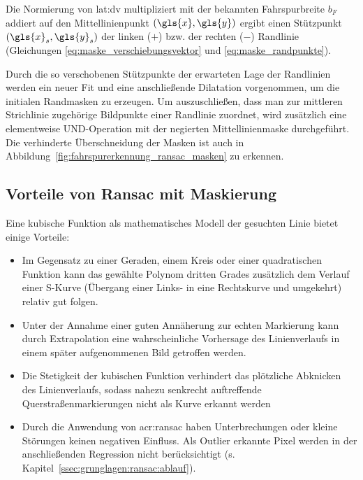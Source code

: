 Die Normierung von \gls{lat:dv} multipliziert mit der bekannten Fahrspurbreite \( b_F \) addiert auf den Mittellinienpunkt \( (\gls{x},\gls{y}) \) ergibt einen Stützpunkt \( ({\gls{x}}_s,{\gls{y}}_s) \) der linken (\( + \)) bzw. der rechten (\( - \)) Randlinie (Gleichungen \eqref{eq:maske_verschiebungsvektor} und \eqref{eq:maske_randpunkte}).

Durch die so verschobenen Stützpunkte der erwarteten Lage der Randlinien werden ein neuer Fit und eine anschließende Dilatation vorgenommen, um die initialen Randmasken zu erzeugen. Um auszuschließen, dass man zur mittleren Strichlinie zugehörige Bildpunkte einer Randlinie zuordnet, wird zusätzlich eine elementweise UND-Operation mit der negierten Mittellinienmaske durchgeführt. Die verhinderte Überschneidung der Masken ist auch in Abbildung~\ref{fig:fahrspurerkennung_ransac_masken} zu erkennen.


\subsection{Vorteile von Ransac mit Maskierung}

Eine kubische Funktion als mathematisches Modell der gesuchten Linie bietet einige Vorteile:
\begin{itemize}
\item Im Gegensatz zu einer Geraden, einem Kreis oder einer quadratischen Funktion kann das gewählte Polynom dritten Grades zusätzlich dem Verlauf einer S-Kurve (Übergang einer Links- in eine Rechtskurve und umgekehrt) relativ gut folgen. 
\item Unter der Annahme einer guten Annäherung zur echten Markierung kann durch Extrapolation eine wahrscheinliche Vorhersage des Linienverlaufs in einem später aufgenommenen Bild getroffen werden. 
\item Die Stetigkeit der kubischen Funktion verhindert das plötzliche Abknicken des Linienverlaufs, sodass nahezu senkrecht auftreffende Querstraßenmarkierungen nicht als Kurve erkannt werden
\item Durch die Anwendung von \gls{acr:ransac} haben Unterbrechungen oder kleine Störungen keinen negativen Einfluss. Als Outlier erkannte Pixel werden in der anschließenden Regression nicht berücksichtigt (s. Kapitel~\ref{ssec:grunglagen:ransac:ablauf}).
\end{itemize}

